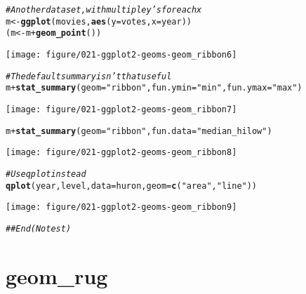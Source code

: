 \documentclass[a4paper,titlepage]{tufte-handout}\usepackage[]{graphicx}\usepackage[]{color}
\makeatletter
\def\maxwidth{ %
  \ifdim\Gin@nat@width>\linewidth
    \linewidth
  \else
    \Gin@nat@width
  \fi
}
\newcommand{\hlstr}[1]{\textcolor[rgb]{0.192,0.494,0.8}{#1}}%
\newcommand{\hlcom}[1]{\textcolor[rgb]{0.678,0.584,0.686}{\textit{#1}}}%
\newcommand{\hlopt}[1]{\textcolor[rgb]{0,0,0}{#1}}%
\newcommand{\hlstd}[1]{\textcolor[rgb]{0.345,0.345,0.345}{#1}}%
\newcommand{\hlkwb}[1]{\textcolor[rgb]{0.69,0.353,0.396}{#1}}%
\newcommand{\hlkwc}[1]{\textcolor[rgb]{0.333,0.667,0.333}{#1}}%
\newcommand{\hlkwd}[1]{\textcolor[rgb]{0.737,0.353,0.396}{\textbf{#1}}}%
\newenvironment{kframe}{%
 \def\at@end@of@kframe{}%
 \ifinner\ifhmode%
  \def\at@end@of@kframe{\end{minipage}}%
  \begin{minipage}{\columnwidth}%
 \fi\fi%
 \def\FrameCommand##1{\hskip\@totalleftmargin \hskip-\fboxsep
 \colorbox{shadecolor}{##1}\hskip-\fboxsep
     \hskip-\linewidth \hskip-\@totalleftmargin \hskip\columnwidth}%
 \MakeFramed {\advance\hsize-\width
   \@totalleftmargin\z@ \linewidth\hsize
   \@setminipage}}%
 {\par\unskip\endMakeFramed%
 \at@end@of@kframe}
\newenvironment{knitrout}{}{} %
\makeatother
\begin{document}
\begin{knitrout}
\begin{kframe}\begin{alltt}
\hlcom{# Another data set, with multiple y's for each x}
\hlstd{m} \hlkwb{<-} \hlkwd{ggplot}\hlstd{(movies,} \hlkwd{aes}\hlstd{(}\hlkwc{y}\hlstd{=votes,} \hlkwc{x}\hlstd{=year))}
\hlstd{(m} \hlkwb{<-} \hlstd{m} \hlopt{+} \hlkwd{geom_point}\hlstd{())}
\end{alltt}
\end{kframe}
\texttt{[image: figure/021-ggplot2-geoms-geom\_ribbon6]} 
\begin{kframe}\begin{alltt}
\hlcom{# The default summary isn't that useful}
\hlstd{m} \hlopt{+} \hlkwd{stat_summary}\hlstd{(}\hlkwc{geom}\hlstd{=}\hlstr{"ribbon"}\hlstd{,} \hlkwc{fun.ymin}\hlstd{=}\hlstr{"min"}\hlstd{,} \hlkwc{fun.ymax}\hlstd{=}\hlstr{"max"}\hlstd{)}
\end{alltt}
\end{kframe}
\texttt{[image: figure/021-ggplot2-geoms-geom\_ribbon7]} 
\begin{kframe}\begin{alltt}
\hlstd{m} \hlopt{+} \hlkwd{stat_summary}\hlstd{(}\hlkwc{geom}\hlstd{=}\hlstr{"ribbon"}\hlstd{,} \hlkwc{fun.data}\hlstd{=}\hlstr{"median_hilow"}\hlstd{)}
\end{alltt}
\end{kframe}
\texttt{[image: figure/021-ggplot2-geoms-geom\_ribbon8]} 
\begin{kframe}\begin{alltt}
\hlcom{# Use qplot instead}
\hlkwd{qplot}\hlstd{(year, level,} \hlkwc{data}\hlstd{=huron,} \hlkwc{geom}\hlstd{=}\hlkwd{c}\hlstd{(}\hlstr{"area"}\hlstd{,} \hlstr{"line"}\hlstd{))}
\end{alltt}


{\ttfamily\noindent\color{warningcolor}{\#\# Warning: Removed 9 rows containing missing values (position\_stack).}}\end{kframe}
\texttt{[image: figure/021-ggplot2-geoms-geom\_ribbon9]} 
\begin{kframe}\begin{alltt}
\hlcom{## End(No test)}
\end{alltt}
\end{kframe}
\end{knitrout}



\section{geom\_rug}
\end{document}

